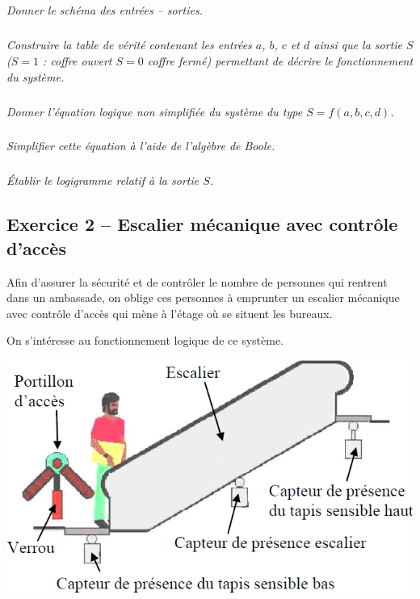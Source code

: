 \documentclass[10pt]{article}
\begin{document}
\subparagraph{}
\textit{Donner le schéma des entrées -- sorties.}


\subparagraph{}
\textit{Construire la table de vérité contenant les entrées $a$, $b$, $c$ et $d$ ainsi que la sortie $S$ ($S=1$ : coffre ouvert $S=0$ coffre fermé) permettant de décrire le fonctionnement du système.}

\subparagraph{}
\textit{Donner l'équation logique non simplifiée du système du type $S=f(a,b,c,d)$.}

\subparagraph{}
\textit{Simplifier cette équation à l'aide de l'algèbre de Boole.}
%

\subparagraph{}
\textit{Établir le logigramme relatif à la sortie $S$.}
%


\subsection*{Exercice 2 -- Escalier mécanique avec contrôle d'accès}

\begin{minipage}[c]{.45\linewidth}
Afin d'assurer la sécurité et de contrôler le nombre de personnes qui rentrent dans un ambassade, on oblige ces personnes à emprunter un escalier mécanique avec contrôle d'accès qui mène à l'étage où se situent les bureaux.

On s'intéresse au fonctionnement logique de ce système.


\end{minipage}
\hfill
\begin{minipage}[c]{.45\linewidth}
\begin{center}
\includegraphics[width=.9\textwidth]{images/fig1}
\end{center}
\end{minipage}
\end{document}
